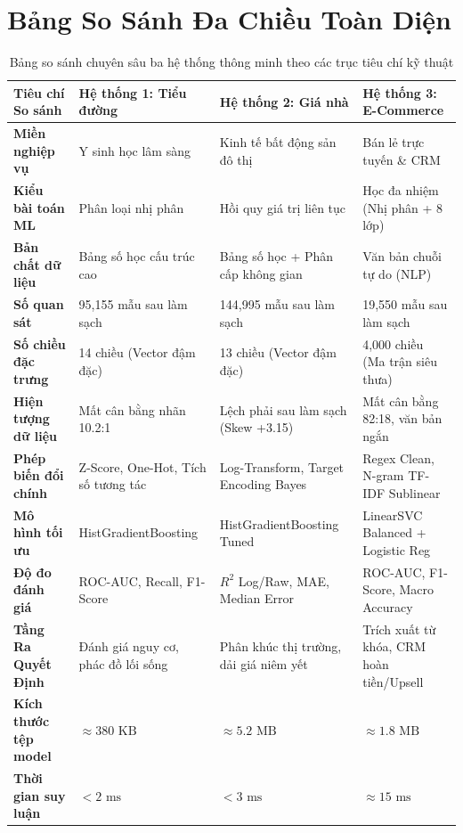 \documentclass[12pt,a4paper]{report}
\begin{document}
\section{Bảng So Sánh Đa Chiều Toàn Diện}

\begin{table}[H]
\centering
\scriptsize
\caption{Bảng so sánh chuyên sâu ba hệ thống thông minh theo các trục tiêu chí kỹ thuật}
\label{tab:deep_comparison_chapter5}
\begin{tabularx}{\textwidth}{lXXX}
\toprule
\textbf{Tiêu chí So sánh} & \textbf{Hệ thống 1: Tiểu đường} & \textbf{Hệ thống 2: Giá nhà} & \textbf{Hệ thống 3: E-Commerce} \\
\midrule
\textbf{Miền nghiệp vụ} & Y sinh học lâm sàng & Kinh tế bất động sản đô thị & Bán lẻ trực tuyến \& CRM \\
\textbf{Kiểu bài toán ML} & Phân loại nhị phân & Hồi quy giá trị liên tục & Học đa nhiệm (Nhị phân + 8 lớp) \\
\textbf{Bản chất dữ liệu} & Bảng số học cấu trúc cao & Bảng số học + Phân cấp không gian & Văn bản chuỗi tự do (NLP) \\
\textbf{Số quan sát} & 95,155 mẫu sau làm sạch & 144,995 mẫu sau làm sạch & 19,550 mẫu sau làm sạch \\
\textbf{Số chiều đặc trưng} & 14 chiều (Vector đậm đặc) & 13 chiều (Vector đậm đặc) & 4,000 chiều (Ma trận siêu thưa) \\
\textbf{Hiện tượng dữ liệu} & Mất cân bằng nhãn 10.2:1 & Lệch phải sau làm sạch (Skew +3.15) & Mất cân bằng 82:18, văn bản ngắn \\
\textbf{Phép biến đổi chính} & Z-Score, One-Hot, Tích số tương tác & Log-Transform, Target Encoding Bayes & Regex Clean, N-gram TF-IDF Sublinear \\
\textbf{Mô hình tối ưu} & HistGradientBoosting & HistGradientBoosting Tuned & LinearSVC Balanced + Logistic Reg \\
\textbf{Độ đo đánh giá} & ROC-AUC, Recall, F1-Score & $R^2$ Log/Raw, MAE, Median Error & ROC-AUC, F1-Score, Macro Accuracy \\
\textbf{Tầng Ra Quyết Định} & Đánh giá nguy cơ, phác đồ lối sống & Phân khúc thị trường, dải giá niêm yết & Trích xuất từ khóa, CRM hoàn tiền/Upsell \\
\textbf{Kích thước tệp model} & $\approx 380\text{ KB}$ & $\approx 5.2\text{ MB}$ & $\approx 1.8\text{ MB}$ \\
\textbf{Thời gian suy luận} & $< 2\text{ ms}$ & $< 3\text{ ms}$ & $\approx 15\text{ ms}$ \\
\bottomrule
\end{tabularx}
\end{table}
\end{document}
